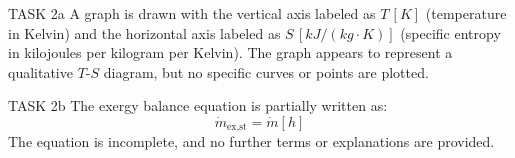 TASK 2a  
A graph is drawn with the vertical axis labeled as \( T \, [K] \) (temperature in Kelvin) and the horizontal axis labeled as \( S \, [kJ/(kg \cdot K)] \) (specific entropy in kilojoules per kilogram per Kelvin). The graph appears to represent a qualitative \( T \)-\( S \) diagram, but no specific curves or points are plotted.

TASK 2b  
The exergy balance equation is partially written as:  
\[
\dot{m}_{\text{ex,st}} = \dot{m} \left[ h \right]
\]  
The equation is incomplete, and no further terms or explanations are provided.